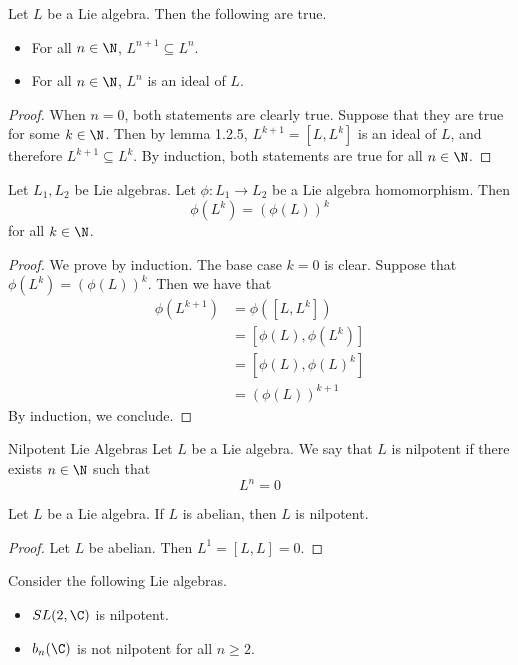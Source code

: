 \documentclass[a4paper]{article}
\begin{document}
\begin{lmm}{}{} Let $L$ be a Lie algebra. Then the following are true. 
\begin{itemize}
\item For all $n\in\N$, $L^{n+1}\subseteq L^n$. 
\item For all $n\in\N$, $L^n$ is an ideal of $L$. 
\end{itemize} \tcbline
\begin{proof}
When $n=0$, both statements are clearly true. Suppose that they are true for some $k\in\N$. Then by lemma 1.2.5, $L^{k+1}=[L,L^k]$ is an ideal of $L$, and therefore $L^{k+1}\subseteq L^k$. By induction, both statements are true for all $n\in\N$. 
\end{proof}
\end{lmm}

\begin{lmm}{}{} Let $L_1,L_2$ be Lie algebras. Let $\phi:L_1\to L_2$ be a Lie algebra homomorphism. Then $$\phi(L^k)=(\phi(L))^k$$ for all $k\in\N$. \tcbline
\begin{proof}
We prove by induction. The base case $k=0$ is clear. Suppose that $\phi(L^k)=(\phi(L))^k$. Then we have that 
\begin{align*}
\phi(L^{k+1})&=\phi([L,L^k])\\
&=[\phi(L),\phi(L^k)]\\
&=[\phi(L),\phi(L)^k]\\
&=(\phi(L))^{k+1}
\end{align*}
By induction, we conclude. 
\end{proof}
\end{lmm}

\begin{defn}{Nilpotent Lie Algebras}{} Let $L$ be a Lie algebra. We say that $L$ is nilpotent if there exists $n\in\N$ such that $$L^n=0$$
\end{defn}

\begin{lmm}{}{} Let $L$ be a Lie algebra. If $L$ is abelian, then $L$ is nilpotent. \tcbline
\begin{proof}
Let $L$ be abelian. Then $L^1=[L,L]=0$. 
\end{proof}
\end{lmm}

\begin{eg}{}{} Consider the following Lie algebras. 
\begin{itemize}
\item $SL(2,\C)$ is nilpotent. 
\item $b_n(\C)$ is not nilpotent for all $n\geq 2$. 
\end{itemize}
\end{eg}
\end{document}
